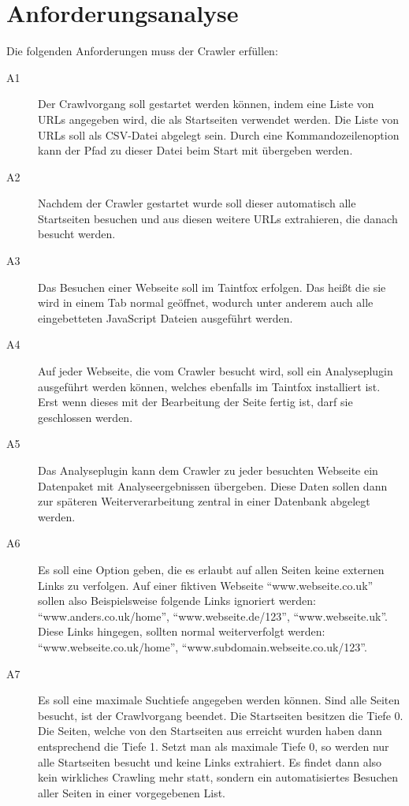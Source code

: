 \section{Anforderungsanalyse}
Die folgenden Anforderungen muss der Crawler erfüllen:
\begin{description}
	\item[ A1 ] Der Crawlvorgang soll gestartet werden können, indem eine Liste von URLs angegeben wird, die als Startseiten verwendet werden. Die Liste von URLs soll als CSV-Datei abgelegt sein. Durch eine Kommandozeilenoption kann der Pfad zu dieser Datei beim Start mit übergeben werden.
	\item[ A2 ] Nachdem der Crawler gestartet wurde soll dieser automatisch alle Startseiten besuchen und aus diesen weitere URLs extrahieren, die danach besucht werden.
	\item[ A3 ] Das Besuchen einer Webseite soll im Taintfox erfolgen. Das heißt die sie wird in einem Tab normal geöffnet, wodurch unter anderem auch alle eingebetteten JavaScript Dateien ausgeführt werden. 
	\item[ A4 ] Auf jeder Webseite, die vom Crawler besucht wird, soll ein Analyseplugin ausgeführt werden können, welches ebenfalls im Taintfox installiert ist. Erst wenn dieses mit der Bearbeitung der Seite fertig ist, darf sie geschlossen werden.
	\item[ A5 ] Das Analyseplugin kann dem Crawler zu jeder besuchten Webseite ein Datenpaket mit Analyseergebnissen übergeben. Diese Daten sollen dann zur späteren Weiterverarbeitung zentral in einer Datenbank abgelegt werden.
	\item[ A6 ] Es soll eine Option geben, die es erlaubt auf allen Seiten keine externen Links zu verfolgen. Auf einer fiktiven Webseite \enquote{www.webseite.co.uk} sollen also Beispielsweise folgende Links ignoriert werden: \\ \enquote{www.anders.co.uk/home}, \enquote{www.webseite.de/123}, \enquote{www.webseite.uk}. Diese Links hingegen, sollten normal weiterverfolgt werden: \\  \enquote{www.webseite.co.uk/home},  \enquote{www.subdomain.webseite.co.uk/123}.
	\item[ A7 ] Es soll eine maximale Suchtiefe angegeben werden können. Sind alle Seiten besucht, ist der Crawlvorgang beendet. Die Startseiten besitzen die Tiefe 0. Die Seiten, welche von den Startseiten aus erreicht wurden haben dann entsprechend die Tiefe 1. Setzt man als maximale Tiefe 0, so werden nur alle Startseiten besucht und keine Links extrahiert. Es findet dann also kein wirkliches Crawling mehr statt, sondern ein automatisiertes Besuchen aller Seiten in einer vorgegebenen List.

\end{description}
